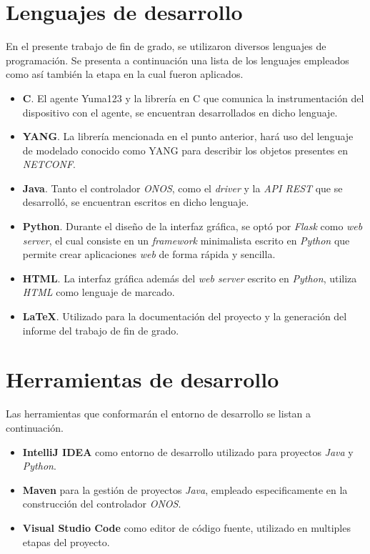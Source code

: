 \section{Lenguajes de desarrollo}
En el presente trabajo de fin de grado, se utilizaron diversos lenguajes de programación. Se presenta a continuación una lista de los lenguajes empleados como así también la etapa en la cual fueron aplicados. 

\begin{itemize}
	\item \textbf{C}. El agente Yuma123 y la librería en C que comunica la instrumentación del dispositivo con el agente, se encuentran desarrollados en dicho lenguaje.  
	\item \textbf{YANG}. La librería mencionada en el punto anterior, hará uso del lenguaje de modelado conocido como YANG para describir los objetos presentes en \textit{NETCONF}. 
	\item \textbf{Java}. Tanto el controlador \textit{ONOS}, como el \textit{driver} y la \textit{API REST} que se desarrolló, se encuentran escritos en dicho lenguaje. 
	\item \textbf{Python}. Durante el diseño de la interfaz gráfica, se optó por \textit{Flask} como \textit{web server}, el cual consiste en un \textit{framework} minimalista escrito en \textit{Python} que permite crear aplicaciones \textit{web} de forma rápida y sencilla. 
	\item \textbf{HTML}. La interfaz gráfica además del \textit{web server} escrito en \textit{Python}, utiliza \textit{HTML} como lenguaje de marcado.  
	\item \textbf{LaTeX}. Utilizado para la documentación del proyecto y la generación del informe del trabajo de fin de grado. 
\end{itemize}

\section{Herramientas de desarrollo}
Las herramientas que conformarán el entorno de desarrollo se listan a continuación.

\begin{itemize}
	\item \textbf{IntelliJ IDEA} como entorno de desarrollo utilizado para proyectos \textit{Java} y \textit{Python}.  
	\item \textbf{Maven} para la gestión de proyectos \textit{Java}, empleado especificamente en la construcción del controlador \textit{ONOS}.
	\item \textbf{Visual Studio Code} como editor de código fuente, utilizado en multiples etapas del proyecto.
\end{itemize}

